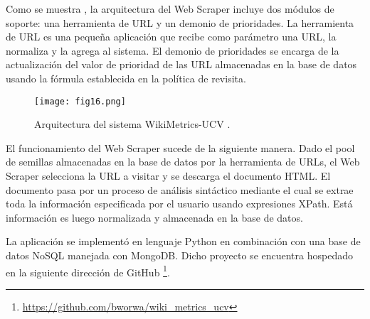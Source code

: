 Como se muestra , la arquitectura del Web Scraper incluye dos módulos de soporte: una herramienta de URL y un demonio de prioridades. La herramienta de URL es una pequeña aplicación que recibe como parámetro una URL, la normaliza y la agrega al sistema. El demonio de prioridades se encarga de la actualización del valor de prioridad de las URL almacenadas en la base de datos usando la fórmula establecida en la política de revisita.

\begin{figure}[htp]
  \centering
  \texttt{[image: fig16.png]}
  \caption[Arquitectura del sistema WikiMetrics-UCV]{Arquitectura del sistema WikiMetrics-UCV \cite[Fig. 3.1]{Dap12}.}
  \label{fig:fig16}
\end{figure}

El funcionamiento del Web Scraper sucede de la siguiente manera. Dado el pool de semillas almacenadas en la base de datos por la herramienta de URLs, el Web Scraper selecciona la URL a visitar y se descarga el documento HTML. El documento pasa por un proceso de análisis sintáctico mediante el cual se extrae toda la información especificada por el usuario usando expresiones XPath. Está información es luego normalizada y almacenada en la base de datos.

La aplicación se implementó en lenguaje Python en combinación con una base de datos NoSQL manejada con MongoDB. Dicho proyecto se encuentra hospedado en la siguiente dirección de GitHub \footnote{\url{https://github.com/bworwa/wiki_metrics_ucv}}.
